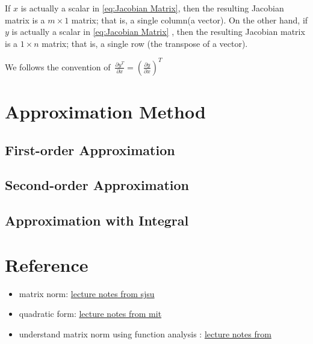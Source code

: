 \begin{remark}
    If $x$ is actually a scalar in \eqref{eq:Jacobian Matrix}, then the resulting Jacobian matrix is a $m\times 1$ matrix;
    that is, a single column(a vector). 
    On the other hand, if $y$ is actually a scalar in \eqref{eq:Jacobian Matrix} , then the resulting Jacobian matrix is a $1\times n$ matrix; 
    that is, a single row (the transpose of a vector).
\end{remark}
\begin{remark}
    We follows the convention of\ $\frac{\partial y^T}{\partial x}=(\frac{\partial y}{\partial x})^T$
\end{remark}

\section{Approximation Method}
\subsection{First-order Approximation}

\subsection{Second-order Approximation}

\subsection{Approximation with Integral}



\section{Reference}
\begin{itemize}
    \item matrix norm: \href{https://www.sjsu.edu/faculty/guangliang.chen/Math253S20/lec7matrixnorm.pdf}{lecture notes from sjsu}
    \item quadratic form: \href{https://ocw.mit.edu/courses/15-084j-nonlinear-programming-spring-2004/resources/lec4_quad_form/}{lecture notes from mit}
    \item understand matrix norm using function analysis : \href{https://sites.math.washington.edu/~greenbau/Math_554/Course_Notes/ch1.3new.pdf}{lecture notes from }
\end{itemize}

